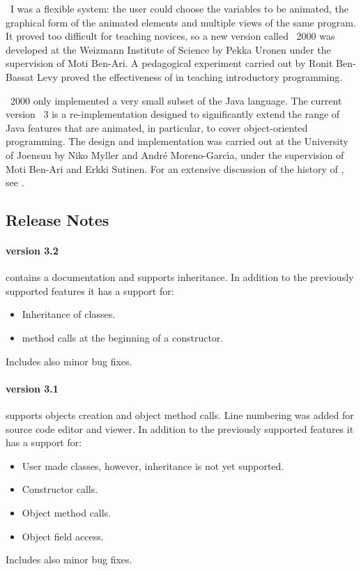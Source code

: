 \jel{}~I was a flexible system: the user could choose the variables to
be animated, the graphical form of the animated elements and multiple
views of the same program. It proved too difficult for teaching novices,
so a new version called \jel{}~2000 was developed at the Weizmann Institute
of Science by Pekka Uronen under the supervision of Moti Ben-Ari.
A pedagogical experiment carried out by Ronit Ben-Bassat Levy proved
the effectiveness of \jel{} in teaching introductory programming.

\jel{}~2000 only implemented a very small subset of the Java language.
The current version \jel{}~3 is a re-implementation designed to
significantly extend the range of Java features that are animated,
in particular, to cover object-oriented programming. The design and
implementation was carried out at the University of Joensuu by
Niko Myller and Andr{\'{e}} Moreno-Garc{\'{\i}}a, under the supervision
of Moti Ben-Ari and Erkki Sutinen. For an extensive discussion of the
history of \jel{}, see \citep{Benari2002a}.

\subsection{Release Notes}
\label{sec:Release_Notes}

\paragraph{version 3.2} contains a documentation and supports inheritance.
In addition to the previously supported features it has a support for:
\begin{itemize}
\item Inheritance of classes.
\item {} method calls at the beginning of a constructor.
\end{itemize}
Includes also minor bug fixes.

\paragraph{version 3.1} supports objects creation and object method calls.
Line numbering was added for source code editor and viewer.
In addition to the previously supported features it has a support for:
\begin{itemize}
\item User made classes, however, inheritance is not yet supported. 
\item Constructor calls.
\item Object method calls.
\item Object field access.
\end{itemize}
Includes also minor bug fixes.

